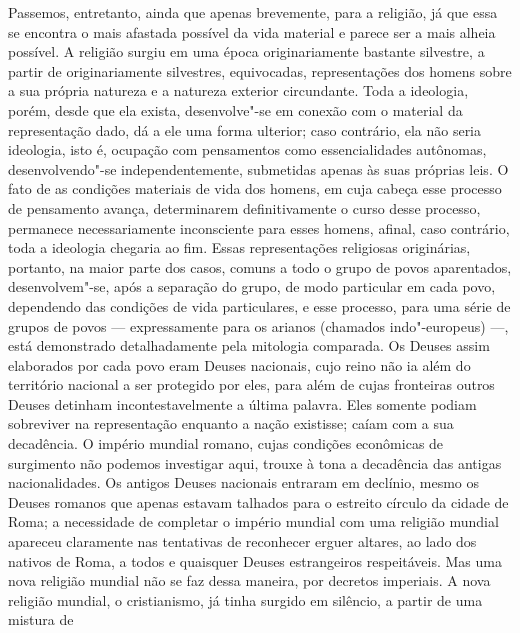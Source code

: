Passemos, entretanto, ainda que apenas brevemente, para a religião, já
que essa se encontra o mais afastada possível da vida material e parece
ser a mais alheia possível. A religião surgiu em uma época
originariamente bastante silvestre, a partir 
de originariamente silvestres, equivocadas, representações dos homens
sobre a sua própria natureza e a natureza exterior circundante. Toda a
ideologia, porém, desde que ela exista, desenvolve"-se em conexão com o
material da representação dado, dá a ele uma forma ulterior; caso
contrário, ela não seria ideologia, isto é, ocupação com pensamentos
como essencialidades autônomas, desenvolvendo"-se independentemente,
submetidas apenas às suas próprias leis. O fato de as condições
materiais de vida dos homens, em cuja cabeça esse processo de pensamento
avança, determinarem definitivamente o curso desse processo, permanece
necessariamente inconsciente para esses homens, afinal, caso contrário,
toda a ideologia chegaria ao fim. Essas representações religiosas %
originárias, portanto, na maior parte dos casos, comuns a todo o grupo
de povos aparentados, desenvolvem"-se, após a separação do grupo, de modo
particular em cada povo, dependendo das condições de vida particulares,
e esse processo, para uma série de grupos de povos --- expressamente para
os arianos (chamados indo"-europeus) ---, está demonstrado detalhadamente
pela mitologia comparada. Os Deuses assim elaborados por cada povo eram
Deuses nacionais, cujo reino não ia além do território nacional a ser
protegido por eles, para além de cujas fronteiras outros Deuses detinham
incontestavelmente a última palavra. Eles somente podiam sobreviver na
representação enquanto a nação existisse; caíam com a sua decadência. O
império mundial romano, cujas condições econômicas de surgimento não
podemos investigar aqui, trouxe à tona a decadência das antigas
nacionalidades. Os antigos Deuses nacionais entraram em declínio, mesmo
os Deuses romanos que apenas estavam talhados para o estreito círculo da
cidade de Roma; a necessidade de completar o império mundial com uma
religião mundial apareceu claramente nas tentativas de reconhecer
erguer altares, ao lado dos nativos de Roma, a todos e quaisquer Deuses
estrangeiros respeitáveis. Mas uma nova religião mundial não se faz
dessa maneira, por decretos imperiais. A nova religião mundial, o
cristianismo, já tinha surgido em silêncio, a partir de uma mistura de
